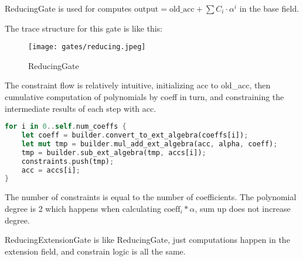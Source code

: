 
\hspace*{\fill}

\indent ReducingGate is used for computes $\text{output} = \text{old\_acc} + \sum C_i \cdot\alpha^i$ in the base field.

The trace structure for this gate is like this:

\begin{figure}[!ht]
    \centering
    \texttt{[image: gates/reducing.jpeg]}
    \caption{ReducingGate}
    \label{fig:reducing}
\end{figure}

The constraint flow is relatively intuitive, initializing acc to old\_acc, then cumulative computation of polynomials by coeff in turn, 
and constraining the intermediate results of each step with acc.

\begin{lstlisting}[language=rust]
for i in 0..self.num_coeffs {
    let coeff = builder.convert_to_ext_algebra(coeffs[i]);
    let mut tmp = builder.mul_add_ext_algebra(acc, alpha, coeff);
    tmp = builder.sub_ext_algebra(tmp, accs[i]);
    constraints.push(tmp);
    acc = accs[i];
}
\end{lstlisting}

The number of constraints is equal to the number of coefficients. The polynomial degree is 2 which happens when calculating $\text{coeff}_i * \alpha$, sum up does not increase degree.

ReducingExtensionGate is like ReducingGate, just computations happen in the extension field, and constrain logic is all the same.
